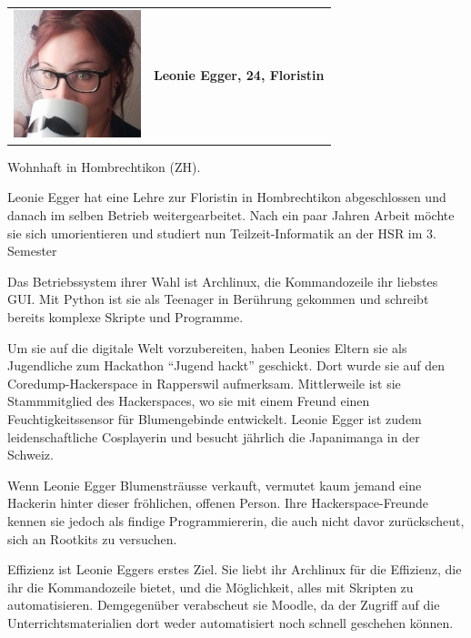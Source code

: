 \documentclass[a4paper]{article}
\begin{document}
\pagebreak
\begin{tabulary}{\linewidth}{m{10em}l}
	\includegraphics[width=10em]{../../img/diverseui01.png} & \textbf{{\large Leonie Egger, 24, Floristin}} \\
\end{tabulary}

\begin{description}[uclist]
	\item[Adresse] Wohnhaft in Hombrechtikon (ZH).
	\item[Ausbildung und Beruf] Leonie Egger hat eine Lehre zur Floristin in Hombrechtikon abgeschlossen und danach im selben Betrieb weitergearbeitet. Nach ein paar Jahren Arbeit möchte sie sich umorientieren und studiert nun Teilzeit-Informatik an der HSR im 3. Semester
	\item[Informatikkenntnisse] Das Betriebssystem ihrer Wahl ist Archlinux, die Kommandozeile ihr liebstes GUI. Mit Python ist sie als Teenager in Berührung gekommen und schreibt bereits komplexe Skripte und Programme.
	\item[Freizeitbeschäftigung] Um sie auf die digitale Welt vorzubereiten, haben Leonies Eltern sie als Jugendliche zum Hackathon ``Jugend hackt'' geschickt. Dort wurde sie auf den Coredump-Hackerspace in Rapperswil aufmerksam. Mittlerweile ist sie Stammmitglied des Hackerspaces, wo sie mit einem Freund einen Feuchtigkeitssensor für Blumengebinde entwickelt. Leonie Egger ist zudem leidenschaftliche Cosplayerin und besucht jährlich die Japanimanga in der Schweiz.
	\item[Persönlichkeit] Wenn Leonie Egger Blumensträusse verkauft, vermutet kaum jemand eine Hackerin hinter dieser fröhlichen, offenen Person. Ihre Hackerspace-Freunde kennen sie jedoch als findige Programmiererin, die auch nicht davor zurückscheut, sich an Rootkits zu versuchen.
	\item[Einschränkungen, Ziele und Wünsche] Effizienz ist Leonie Eggers erstes Ziel. Sie liebt ihr Archlinux für die Effizienz, die ihr die Kommandozeile bietet, und die Möglichkeit, alles mit Skripten zu automatisieren. Demgegenüber verabscheut sie Moodle, da der Zugriff auf die Unterrichtsmaterialien dort weder automatisiert noch schnell geschehen können.

\end{description}
\end{document}
